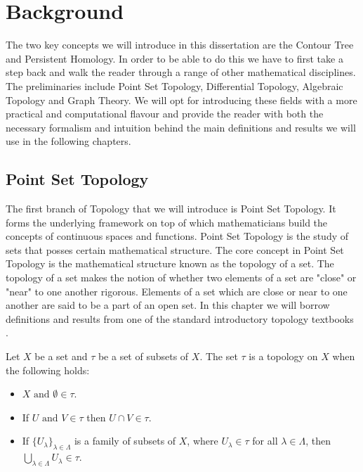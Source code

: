 \chapter{Background}
\label{chapter2}

The two key concepts we will introduce in this dissertation are the Contour Tree and Persistent Homology. In order to be able to do this we have to first take a step back and walk the reader through a range of other mathematical disciplines. The preliminaries include Point Set Topology, Differential Topology, Algebraic Topology and Graph Theory. We will opt for introducing these fields with a more practical and computational flavour and provide the reader with both the necessary formalism and intuition behind the main definitions and results we will use in the following chapters.

\section{Point Set Topology}

The first branch of Topology that we will introduce is Point Set Topology. It forms the underlying framework on top of which mathematicians build the concepts of continuous spaces and functions. Point Set Topology is the study of sets that posses certain mathematical structure. The core concept in Point Set Topology is the mathematical structure known as the topology of a set. The topology of a set makes the notion of whether two elements of a set are "close" or "near" to one another rigorous. Elements of a set which are close or near to one another are said to be a part of an open set.  In this chapter we will borrow definitions and results from one of the standard introductory topology textbooks \cite{intro-topo}.

\begin{defn} Let $X$ be a set and $\tau$ be a set of subsets of $X$. The set $\tau$ is a topology on $X$ when the following holds:  \end{defn}

\begin{itemize}
    \item $X \text{ and } \emptyset \in \tau$.
    \item If $U \text{ and } V \in \tau$ then $U \cap V \in \tau$.
    \item If $\{U_\lambda\}_{\lambda \in \Lambda}$ is a family of subsets of $X$, where $U_\lambda \in \tau$ for all $\lambda \in \Lambda$, then
        $\bigcup_{\lambda \in \Lambda}{U_\lambda} \in \tau$.
\end{itemize}

